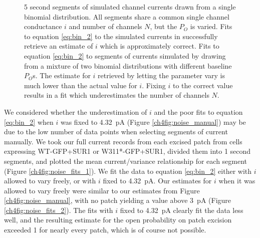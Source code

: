 \begin{figure}[h]
\begin{subfigure}[t]{0.3\textwidth}
	\end{subfigure}
	\caption[Simulated multibinomial currents]{
	 5 second segments of simulated channel currents drawn from a single binomial distribution.
	All segments share a common single channel conductance $i$ and number of channels $N$, but the $P_O$ is varied.
	 Fits to equation \ref{eq:bin_2} to the simulated currents in  successfully retrieve an estimate of $i$ which is approximately correct.
	 Fits to equation \ref{eq:bin_2} to segments of currents simulated by drawing from a mixture of two binomial distributions with different baseline $P_O$s.
	The estimate for $i$ retrieved by letting the parameter vary is much lower than the actual value for $i$.
	Fixing $i$ to the correct value results in a fit which underestimates the number of channels $N$.
	}\label{ch4fig:noise_sim}
\end{figure}

We considered whether the underestimation of $i$ and the poor fits to equation \ref{eq:bin_2} when $i$ was fixed to \SI{4.32}{\pico\ampere} (Figure \ref{ch4fig:noise_manual}) may be due to the low number of data points when selecting segments of current manually.
We took our full current records from each excised patch from cells expressing WT-GFP+SUR1 or W311*-GFP+SUR1, divided them into 1 second segments, and plotted the mean current/variance relationship for each segment (Figure \ref{ch4fig:noise_fits_1}).
We fit the data to equation \ref{eq:bin_2} either with $i$ allowed to vary freely, or with $i$ fixed to \SI{4.32}{\pico\ampere}.
Our estimates for $i$ when it was allowed to vary freely were similar to our estimates from Figure \ref{ch4fig:noise_manual}, with no patch yielding a value above \SI{3}{\pico\ampere} (Figure \ref{ch4fig:noise_fits_2}).
The fits with $i$ fixed to \SI{4.32}{\pico\ampere} clearly fit the data less well, and the resulting estimate for the open probability on patch excision exceeded 1 for nearly every patch, which is of course not possible.

